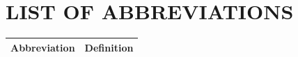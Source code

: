 \chapter*{LIST OF ABBREVIATIONS}

\begin{longtable}{@{}>{\raggedright\arraybackslash}p{}p{}@{}}
\toprule
\textbf{Abbreviation} & \textbf{Definition} \\
\midrule
\endhead
\bottomrule
\end{longtable}
